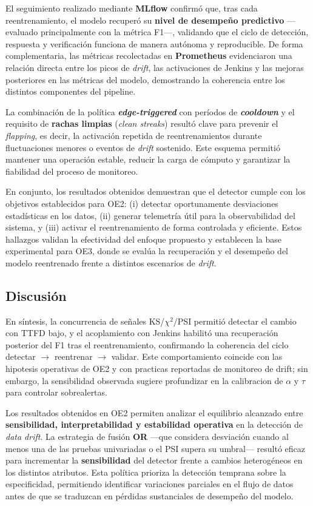 El seguimiento realizado mediante \textbf{MLflow} confirmó que, tras cada reentrenamiento, el modelo recuperó su \textbf{nivel de desempeño predictivo} —evaluado principalmente con la métrica F1—, validando que el ciclo de detección, respuesta y verificación funciona de manera autónoma y reproducible.  
De forma complementaria, las métricas recolectadas en \textbf{Prometheus} evidenciaron una relación directa entre los picos de \textit{drift}, las activaciones de Jenkins y las mejoras posteriores en las métricas del modelo, demostrando la coherencia entre los distintos componentes del pipeline.

La combinación de la política \textbf{\textit{edge-triggered}} con períodos de \textbf{\textit{cooldown}} y el requisito de \textbf{rachas limpias} (\textit{clean streaks}) resultó clave para prevenir el \textit{flapping}, es decir, la activación repetida de reentrenamientos durante fluctuaciones menores o eventos de \textit{drift} sostenido.  
Este esquema permitió mantener una operación estable, reducir la carga de cómputo y garantizar la fiabilidad del proceso de monitoreo.

En conjunto, los resultados obtenidos demuestran que el detector cumple con los objetivos establecidos para OE2:  
(i) detectar oportunamente desviaciones estadísticas en los datos,  
(ii) generar telemetría útil para la observabilidad del sistema, y  
(iii) activar el reentrenamiento de forma controlada y eficiente.  
Estos hallazgos validan la efectividad del enfoque propuesto y establecen la base experimental para OE3, donde se evalúa la recuperación y el desempeño del modelo reentrenado frente a distintos escenarios de \textit{drift}.


\subsection{Discusión}
En síntesis, la concurrencia de señales KS/$\chi^2$/PSI permitió detectar el cambio con TTFD bajo, y el acoplamiento con Jenkins habilitó una recuperación posterior del F1 tras el reentrenamiento, confirmando la coherencia del ciclo detectar $\rightarrow$ reentrenar $\rightarrow$ validar.
Este comportamiento coincide con las hipotesis operativas de OE2 y con practicas reportadas de monitoreo de drift; sin embargo, la sensibilidad observada sugiere profundizar en la calibracion de $\alpha$ y $\tau$ para controlar sobrealertas.


Los resultados obtenidos en OE2 permiten analizar el equilibrio alcanzado entre \textbf{sensibilidad, interpretabilidad y estabilidad operativa} en la detección de \textit{data drift}.  
La estrategia de fusión \textbf{OR} —que considera desviación cuando al menos una de las pruebas univariadas o el PSI supera su umbral— resultó eficaz para incrementar la \textbf{sensibilidad} del detector frente a cambios heterogéneos en los distintos atributos.  
Esta política prioriza la detección temprana sobre la especificidad, permitiendo identificar variaciones parciales en el flujo de datos antes de que se traduzcan en pérdidas sustanciales de desempeño del modelo.

